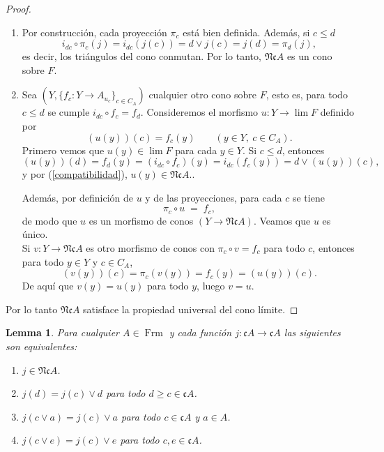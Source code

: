 \documentclass[11pt]{amsart}
\DeclareMathOperator{\Frm}{Frm}
\theoremstyle{plain}
\newtheorem{lem}[thm]{Lemma}
\theoremstyle{definition}
\begin{document}
\begin{proof}
\begin{enumerate}
    \item Por construcción, cada proyección $\pi_c$ está bien definida. Además, si $c\leq d$
    \[
    i_{dc}\circ \pi_c(j)=i_{dc}(j(c))= d\vee j(c)=j(d)= \pi_d(j),
    \]
es decir, los triángulos del cono conmutan. Por lo tanto, $\mathfrak{Nc}A$ es un cono sobre $F$.

\item Sea $(Y,\{f_c\colon Y\to A_{u_c}\}_{c\in C_A})$ cualquier otro cono sobre $F$, esto es,
para todo $c\le d$ se cumple $i_{dc}\circ f_c=f_d$. 
Consideremos el morfismo $u:Y\to \lim F$ definido por
\[
(u(y))(c)=f_c(y)\qquad (y\in Y,\ c\in C_A).
\]
Primero vemos que $u(y)\in\lim F$ para cada $y\in Y$. Si $c\le d$, entonces
\[
(u(y))(d)=f_d(y)=(i_{dc}\circ f_c)(y)=i_{dc}(f_c(y))
=d\vee(u(y))(c),
\]
y por (\ref{compatibilidad}), $u(y)\in \mathfrak{Nc}A.$.

Además, por definición de $u$ y de las proyecciones, para cada $c$ se tiene
\[
\pi_c\circ u \;=\; f_c,
\]
de modo que $u$ es un morfismo de conos $(Y\to \mathfrak{Nc}A)$. Veamos que $u$ es único.\\

Si $v\colon Y\to \mathfrak{Nc}A$ es otro morfismo de conos con 
$\pi_c\circ v = f_c$ para todo $c$, entonces para todo $y\in Y$ y $c\in C_A$,
\[
(v(y))(c)=\pi_c(v(y))=f_c(y)=(u(y))(c).
\]
De aquí que $v(y)=u(y)$ para todo $y$, luego $v=u$.
\end{enumerate}
Por lo tanto $\mathfrak{Nc}A$ satisface la propiedad universal del cono límite.
\end{proof}

\begin{lem}\label{Lema3.1}
    Para cualquier $A\in \Frm$ y cada función $j\colon \mathfrak{c}A\to \mathfrak{c}A$ las siguientes son equivalentes:
    \begin{enumerate}
        \item $j\in \mathfrak{Nc}A$.
        \item $j(d)=j(c)\vee d$ para todo $d\geq c\in \mathfrak{c}A$.
        \item $j(c\vee a)=j(c)\vee a$ para todo $c\in \mathfrak{c}A$ y $a\in A$.
        \item $j(c\vee e)=j(c)\vee e$ para todo $c, e\in \mathfrak{c}A$.
    \end{enumerate}
\end{lem}
\end{document}
